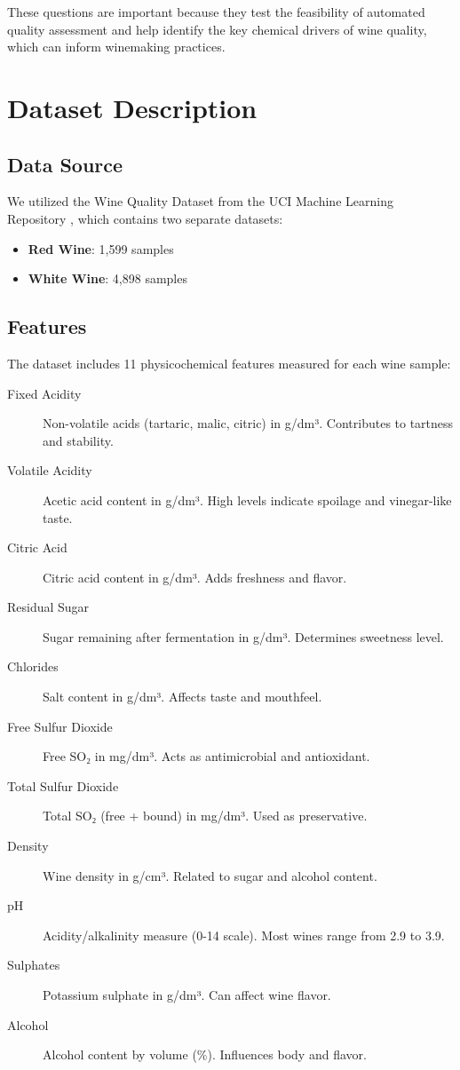 \documentclass[12pt]{article}
\begin{document}
These questions are important because they test the feasibility of automated quality assessment and help identify the key chemical drivers of wine quality, which can inform winemaking practices.

\section{Dataset Description}

\subsection{Data Source}
We utilized the Wine Quality Dataset from the UCI Machine Learning Repository \cite{uci_wine}, which contains two separate datasets:
\begin{itemize}
    \item \textbf{Red Wine}: 1,599 samples
    \item \textbf{White Wine}: 4,898 samples
\end{itemize}

\subsection{Features}
The dataset includes 11 physicochemical features measured for each wine sample:

\begin{description}
    \item[Fixed Acidity] Non-volatile acids (tartaric, malic, citric) in g/dm³. Contributes to tartness and stability.
    \item[Volatile Acidity] Acetic acid content in g/dm³. High levels indicate spoilage and vinegar-like taste.
    \item[Citric Acid] Citric acid content in g/dm³. Adds freshness and flavor.
    \item[Residual Sugar] Sugar remaining after fermentation in g/dm³. Determines sweetness level.
    \item[Chlorides] Salt content in g/dm³. Affects taste and mouthfeel.
    \item[Free Sulfur Dioxide] Free SO₂ in mg/dm³. Acts as antimicrobial and antioxidant.
    \item[Total Sulfur Dioxide] Total SO₂ (free + bound) in mg/dm³. Used as preservative.
    \item[Density] Wine density in g/cm³. Related to sugar and alcohol content.
    \item[pH] Acidity/alkalinity measure (0-14 scale). Most wines range from 2.9 to 3.9.
    \item[Sulphates] Potassium sulphate in g/dm³. Can affect wine flavor.
    \item[Alcohol] Alcohol content by volume (\%). Influences body and flavor.
\end{description}
\end{document}
